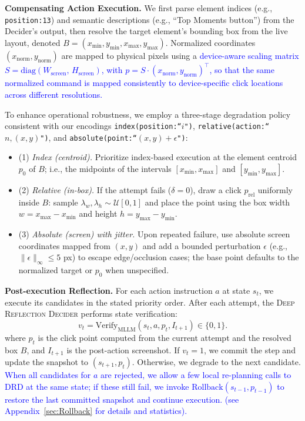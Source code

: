 \documentclass{article} %
\newcommand{\mypara}[1]{\vspace{0.4em}\noindent\textbf{#1}\hspace{0.2cm}}
\newcommand{\revise}[1]{\textcolor{blue}{#1}}
\begin{document}
\mypara{Compensating Action Execution.} We first parse element indices (e.g., \texttt{position:13}) and semantic descriptions (e.g., “Top Moments button”) from the Decider’s output, then resolve the target element’s bounding box from the live layout, denoted
\(B=(x_{\min},y_{\min},x_{\max},y_{\max})\). Normalized coordinates \((x_{\text{norm}},y_{\text{norm}})\) are mapped to physical pixels using a \revise{device-aware scaling matrix $S=\mathrm{diag}(W_{\text{screen}},\, H_{\text{screen}})$, with
$p = S \cdot (x_{\text{norm}},y_{\text{norm}})^\top$, so that the same normalized command is mapped consistently to device-specific click locations across different resolutions.}

To enhance operational robustness, we employ a three-stage degradation policy consistent with our encodings \texttt{index(position:``$i$")}, \texttt{relative(action:``$n,(x,y)$")}, and \texttt{absolute(point:``$(x,y)+\epsilon$")}:

\begin{itemize}[leftmargin=*,topsep=0pt]
  \item (1) \textit{Index (centroid).} Prioritize index-based execution at the element centroid \(p_0\) of \(B\); i.e., the midpoints of the intervals \([x_{\min},x_{\max}]\) and \([y_{\min},y_{\max}]\).
  \item (2) \textit{Relative (in-box).} If the attempt fails (\(\delta=0\)), draw a click \(p_{\mathrm{rel}}\) uniformly inside \(B\): sample \(\lambda_w,\lambda_h\!\sim\!\mathcal U[0,1]\) and place the point using the box width \(w=x_{\max}-x_{\min}\) and height \(h=y_{\max}-y_{\min}\).
  \item (3) \textit{Absolute (screen) with jitter.} Upon repeated failure, use absolute screen coordinates mapped from \((x,y)\) and add a bounded perturbation \(\epsilon\) (e.g., \(\lVert \epsilon\rVert_\infty\!\le\!5\) px) to escape edge/occlusion cases; the base point defaults to the normalized target or \(p_0\) when unspecified.
\end{itemize}

\mypara{Post-execution Reflection.}
For each action instruction $a$ at state $s_t$, we execute its candidates in the stated priority order. After each attempt, the \textsc{Deep Reflection Decider} performs state verification:
\begin{equation}
v_{t}=\mathrm{Verify}_{\mathrm{MLLM}}(s_t, a, p_{t}, I_{t+1})\in\{0,1\}.
\end{equation}
where $p_t$ is the click point computed from the current attempt and the resolved box $B$, and $I_{t+1}$ is the post-action screenshot. If $v_t=1$, we commit the step and update the snapshot to $(s_{t+1}, p_t)$. Otherwise, we degrade to the next candidate. \revise{ When all candidates for $a$ are rejected, we allow a few local re-planning calls to DRD at the same state; if these still fail, we invoke $\mathrm{Rollback}(s_{t-1}, p_{t-1})$ to restore the last committed snapshot and continue execution. (see Appendix~\ref{sec:Rollback} for details and statistics).}
\end{document}
